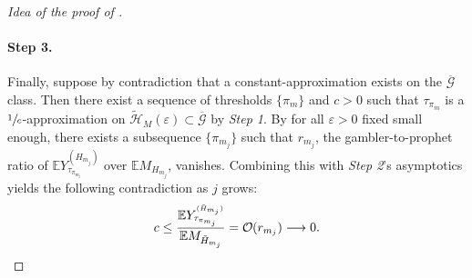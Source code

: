 \documentclass[11pt, a4paper, twoside]{article}
\DeclareRobustCommand{\bigO}{\text{\usefont{OMS}{cmsy}{m}{n}O}}
\newcommand{\ssup}[1]{{\scriptscriptstyle{({#1})}}}
\newcommand{\eps}{\varepsilon}
\newcommand{\EE}{\mathbb{E}}
\newcommand{\PGFd}{\overline{\mathcal{G}}}
\numberwithin{equation}{section}
\begin{document}
\begin{proof}[Idea of the proof of ]
		\paragraph{Step 3.} Finally, suppose by contradiction that a constant-approximation exists on the $\PGFd$ class. Then there exist a sequence of thresholds $\{\pi_m\}$ and $c>0$ such that $\tau_{\pi_m}$ is a $\sfrac{1}{c}$-approximation on $\tilde{\mathcal{H}}_M(\eps)\subset\PGFd$ by \emph{Step 1}. By  for all $\eps>0$ fixed small enough, there exists a subsequence $\{\pi_{m_j}\}$ such that 
		$r_{m_j}$, the gambler-to-prophet ratio of $\EE Y_{\tau_{\pi_{m_j}}}^\ssup{H_{m_j}}$ over $\EE M_{H_{m_j}}$, vanishes. Combining this with \emph{Step 2}'s asymptotics yields the following contradiction as $j$ grows:
		\begin{equation*}
			c\le\frac{ \EE Y_{\tau_{\pi_{m_j}}}^\ssup{\tilde{H}_{m_j}}}{\EE M_{\tilde{H}_{m_j}}}=\bigO( r_{m_j})\longrightarrow0.
		\end{equation*}
	\end{proof}
	
\end{document}
